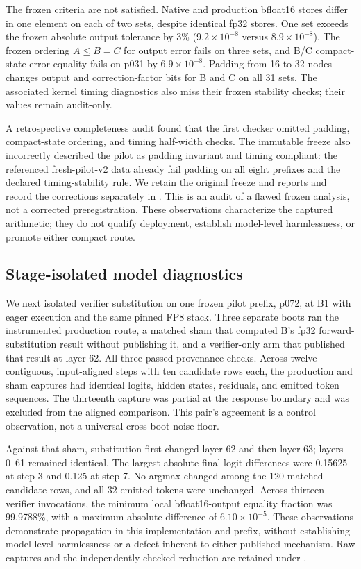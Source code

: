 \documentclass[conference]{IEEEtran}
\begin{document}
The frozen criteria are not satisfied. Native and production bfloat16 stores differ in one element on each of two sets, despite identical fp32 stores. One set exceeds the frozen absolute output tolerance by 3\% ($9.2\times10^{-8}$ versus $8.9\times10^{-8}$). The frozen ordering $A\le B=C$ for output error fails on three sets, and B/C compact-state error equality fails on p031 by $6.9\times10^{-8}$. Padding from 16 to 32 nodes changes output and correction-factor bits for B and C on all 31 sets. The associated kernel timing diagnostics also miss their frozen stability checks; their values remain audit-only.

A retrospective completeness audit found that the first checker omitted padding, compact-state ordering, and timing half-width checks. The immutable freeze also incorrectly described the pilot as padding invariant and timing compliant: the referenced fresh-pilot-v2 data already fail padding on all eight prefixes and the declared timing-stability rule. We retain the original freeze and reports and record the corrections separately in . This is an audit of a flawed frozen analysis, not a corrected preregistration. These observations characterize the captured arithmetic; they do not qualify deployment, establish model-level harmlessness, or promote either compact route.

\subsection{Stage-isolated model diagnostics}
\label{sec:e7b-diagnostic}
We next isolated verifier substitution on one frozen pilot prefix, p072, at B1 with eager execution and the same pinned FP8 stack. Three separate boots ran the instrumented production route, a matched sham that computed B's fp32 forward-substitution result without publishing it, and a verifier-only arm that published that result at layer 62. All three passed provenance checks. Across twelve contiguous, input-aligned steps with ten candidate rows each, the production and sham captures had identical logits, hidden states, residuals, and emitted token sequences. The thirteenth capture was partial at the response boundary and was excluded from the aligned comparison. This pair's agreement is a control observation, not a universal cross-boot noise floor.

Against that sham, substitution first changed layer 62 and then layer 63; layers 0--61 remained identical. The largest absolute final-logit differences were 0.15625 at step 3 and 0.125 at step 7. No argmax changed among the 120 matched candidate rows, and all 32 emitted tokens were unchanged. Across thirteen verifier invocations, the minimum local bfloat16-output equality fraction was 99.9788\%, with a maximum absolute difference of $6.10\times10^{-5}$. These observations demonstrate propagation in this implementation and prefix, without establishing model-level harmlessness or a defect inherent to either published mechanism. Raw captures and the independently checked reduction are retained under .
\end{document}
